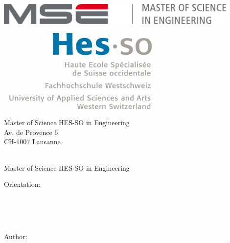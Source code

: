 \begin{titlepage}
{\selectfont
	\begin{flushright}
		\begin{minipage}{0.5\textwidth}
			\begin{flushleft}
				\includegraphics[width=0.9\textwidth]{99-imgs/logo_mse}
			\end{flushleft}
		\end{minipage}%
		\begin{minipage}{0.5\textwidth}
			\begin{flushright}
				\includegraphics[width=0.6\textwidth]{99-imgs/logo_hesso}
			\end{flushright}
		\end{minipage}
		\begin{flushleft}\scriptsize
		Master of Science HES-SO in Engineering \\
		Av. de Provence 6 \\
		CH-1007 Lausanne
		\end{flushleft}
		
		~\\[0.5cm]
		
		{\Huge Master of Science HES-SO in Engineering\\[0.5cm]}
		
		{\LARGE Orientation: \Orientation\\[0.5cm] ~\\[1cm]}
		
		{\Huge \ThesisTitle \\}
		{\large \ThesisSubject \\[1.5cm]}
		
		{
		\large Author:\\
		\Huge \Author \\[1cm] %
		}
		

\end{flushright}}
\end{titlepage}

